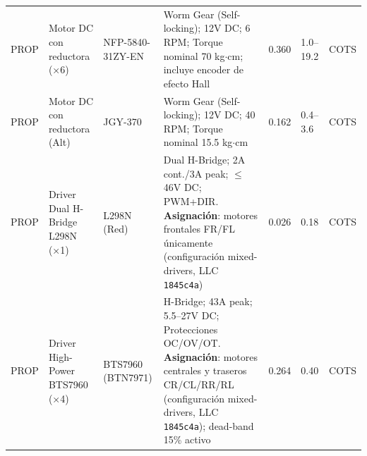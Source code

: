\begin{table}[H]
{\begin{tabular}{p{1.9cm} p{4cm} p{3.2cm} p{4.5cm} p{1.7cm} p{1.7cm} p{1.6cm}}
PROP &
Motor DC con reductora (×6) &
NFP-5840-31ZY-EN &
Worm Gear (Self-locking); 12V DC; 6 RPM; Torque nominal 70 kg$\cdot$cm; incluye encoder de efecto Hall &
0.360 &
1.0--19.2 &
COTS
\\
PROP &
Motor DC con reductora (Alt) &
JGY-370 &
Worm Gear (Self-locking); 12V DC; 40 RPM; Torque nominal 15.5 kg$\cdot$cm &
0.162 &
0.4--3.6 &
COTS
\\
PROP &
Driver Dual H-Bridge L298N (×1) &
L298N (Red) &
Dual H-Bridge; 2A cont./3A peak; $\le$ 46V DC; PWM+DIR. \textbf{Asignación}: motores frontales FR/FL únicamente (configuración mixed-drivers, LLC \texttt{1845c4a}) &
0.026 &
0.18 &
COTS
\\
PROP &
Driver High-Power BTS7960 (×4) &
BTS7960 (BTN7971) &
H-Bridge; 43A peak; 5.5--27V DC; Protecciones OC/OV/OT. \textbf{Asignación}: motores centrales y traseros CR/CL/RR/RL (configuración mixed-drivers, LLC \texttt{1845c4a}); dead-band 15\% activo &
0.264 &
0.40 &
COTS
\\
\hline
\end{tabular}}
\end{table}

